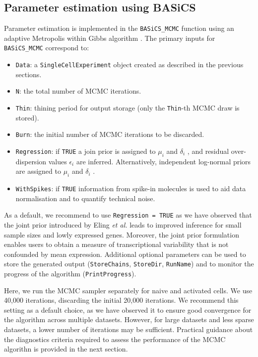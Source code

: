 \documentclass[9pt,a4paper,]{extarticle}
\begin{document}
\hypertarget{parameter-estimation-using-basics}{%
\subsection{Parameter estimation using BASiCS}\label{parameter-estimation-using-basics}}

Parameter estimation is implemented in the \texttt{BASiCS\_MCMC} function using an
adaptive Metropolis within Gibbs algorithm \citep{Roberts2009}.
The primary inputs for \texttt{BASiCS\_MCMC} correspond to:

\begin{itemize}
\item
  \texttt{Data}: a \texttt{SingleCellExperiment} object created as described in the
  previous sections.
\item
  \texttt{N}: the total number of MCMC iterations.
\item
  \texttt{Thin}: thining period for output storage
  (only the \texttt{Thin}-th MCMC draw is stored).
\item
  \texttt{Burn}: the initial number of MCMC iterations to be discarded.
\item
  \texttt{Regression}: if \texttt{TRUE} a join prior is assigned to \(\mu_i\) and \(\delta_i\)
  \citep{Eling2018}, and residual over-dispersion values \(\epsilon_i\) are inferred.
  Alternatively, independent log-normal priors are assigned to \(\mu_i\) and
  \(\delta_i\) \citep{Vallejos2016}.
\item
  \texttt{WithSpikes}: if \texttt{TRUE} information from spike-in molecules is used to aid
  data normalisation and to quantify technical noise.
\end{itemize}

As a default, we recommend to use \texttt{Regression\ =\ TRUE} as we have observed that
the joint prior introduced by Eling \emph{et al.} leads to improved inference for
small sample sizes and lowly expressed genes.
Moreover, the joint prior formulation enables users to obtain a measure of
transcriptional variability that is not confounded by mean expression.
Additional optional parameters can be used to store the generated output
(\texttt{StoreChains}, \texttt{StoreDir}, \texttt{RunName}) and to monitor the progress of the
algorithm (\texttt{PrintProgress}).

Here, we run the MCMC sampler separately for naive and activated cells.
We use 40,000 iterations, discarding the initial 20,000 iterations.
We recommend this setting as a default choice, as we have observed it to
ensure good convergence for the algorithm across multiple datasets.
However, for large datasets and less sparse datasets, a lower number of
iterations may be sufficient.
Practical guidance about the diagnostics criteria required to assess the
performance of the MCMC algorithn is provided in the next section.
\end{document}
